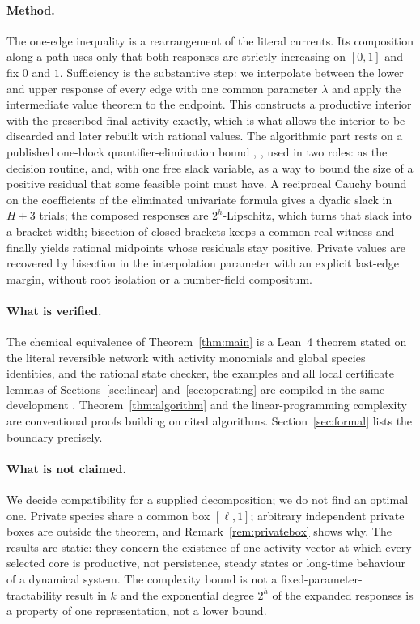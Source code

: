 \documentclass[11pt,a4paper]{article}
\theoremstyle{plain}
\theoremstyle{definition}
\theoremstyle{remark}
\begin{document}
\paragraph{Method.} The one-edge inequality is a rearrangement of the literal currents. Its composition along a path uses only that both responses are strictly increasing on $[0,1]$ and fix $0$ and $1$. Sufficiency is the substantive step: we interpolate between the lower and upper response of every edge with one common parameter $\lambda$ and apply the intermediate value theorem to the endpoint. This constructs a productive interior with the prescribed final activity exactly, which is what allows the interior to be discarded and later rebuilt with rational values. The algorithmic part rests on a published one-block quantifier-elimination bound \citep[Theorem 2.27]{basu2014}, \citep{bpr2006}, used in two roles: as the decision routine, and, with one free slack variable, as a way to bound the size of a positive residual that some feasible point must have. A reciprocal Cauchy bound on the coefficients of the eliminated univariate formula gives a dyadic slack in $H+3$ trials; the composed responses are $2^h$-Lipschitz, which turns that slack into a bracket width; bisection of closed brackets keeps a common real witness and finally yields rational midpoints whose residuals stay positive. Private values are recovered by bisection in the interpolation parameter with an explicit last-edge margin, without root isolation or a number-field compositum.

\paragraph{What is verified.} The chemical equivalence of Theorem~\ref{thm:main} is a Lean~4 theorem stated on the literal reversible network with activity monomials and global species identities, and the rational state checker, the examples and all local certificate lemmas of Sections~\ref{sec:linear} and~\ref{sec:operating} are compiled in the same development \citep{demoura2021,mathlib2020}. Theorem~\ref{thm:algorithm} and the linear-programming complexity are conventional proofs building on cited algorithms. Section~\ref{sec:formal} lists the boundary precisely.

\paragraph{What is not claimed.} We decide compatibility for a supplied decomposition; we do not find an optimal one. Private species share a common box $[\ell,1]$; arbitrary independent private boxes are outside the theorem, and Remark~\ref{rem:privatebox} shows why. The results are static: they concern the existence of one activity vector at which every selected core is productive, not persistence, steady states or long-time behaviour of a dynamical system. The complexity bound is not a fixed-parameter-tractability result in $k$ and the exponential degree $2^h$ of the expanded responses is a property of one representation, not a lower bound.
\end{document}
